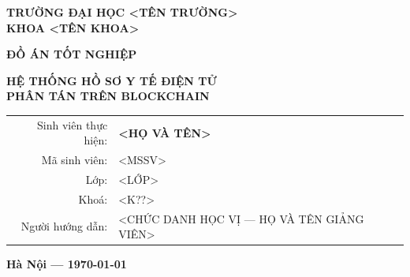 \documentclass[../quyen]{subfiles}
\begin{document}
\begin{titlepage}
\begin{center}

\textbf{\large TRƯỜNG ĐẠI HỌC <TÊN TRƯỜNG>} \\
\textbf{\large KHOA <TÊN KHOA>} \\
\vspace{0.5cm}

\vspace{3cm}

\textbf{\Large ĐỒ ÁN TỐT NGHIỆP} \\
\vspace{0.5cm}

\textbf{\LARGE HỆ THỐNG HỒ SƠ Y TẾ ĐIỆN TỬ\\PHÂN TÁN TRÊN BLOCKCHAIN}

\vspace{2cm}

\begin{tabular}{rl}
Sinh viên thực hiện: & \textbf{<HỌ VÀ TÊN>} \\
Mã sinh viên: & <MSSV> \\
Lớp: & <LỚP> \\
Khoá: & <K??> \\
Người hướng dẫn: & <CHỨC DANH HỌC VỊ — HỌ VÀ TÊN GIẢNG VIÊN> \\
\end{tabular}

\vfill

\textbf{Hà Nội — \today}

\end{center}
\end{titlepage}
\end{document}
